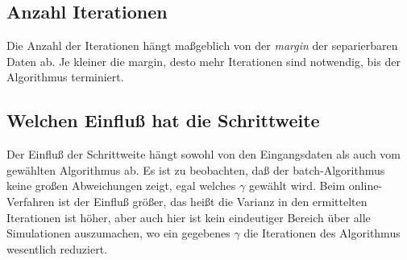 \documentclass[]{report}
\begin{document}
\subsection{Anzahl Iterationen}

Die Anzahl der Iterationen h\"angt ma{\ss}geblich von der \emph{margin} der separierbaren Daten ab. Je kleiner die margin, desto mehr Iterationen sind notwendig, bis der Algorithmus terminiert.


\subsection{Welchen Einflu{\ss} hat die Schrittweite}

Der Einflu{\ss} der Schrittweite h\"angt sowohl von den Eingangsdaten als auch vom gew\"ahlten Algorithmus ab.
Es ist zu beobachten, da{\ss} der batch-Algorithmus keine gro{\ss}en Abweichungen zeigt, egal welches $\gamma$ gew\"ahlt wird. Beim online-Verfahren ist der Einflu{\ss} gr\"o{\ss}er, das hei{\ss}t die Varianz in den ermittelten Iterationen ist h\"oher, aber auch hier ist kein eindeutiger Bereich \"uber alle Simulationen auszumachen, wo ein gegebenes $\gamma$ die Iterationen des Algorithmus wesentlich reduziert.
\end{document}
